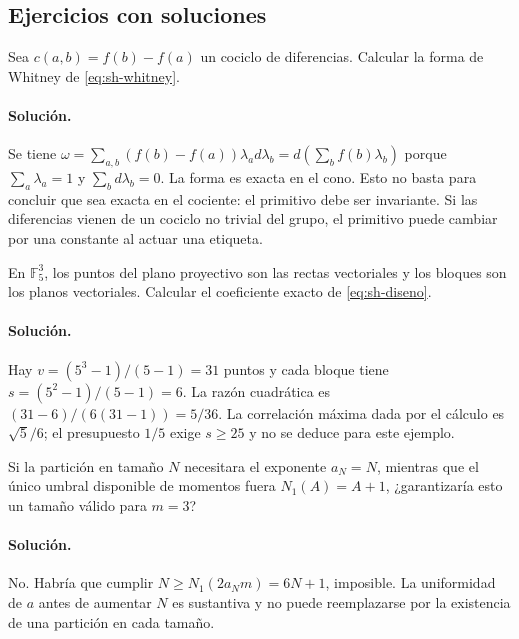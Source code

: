 \clearpage
\subsection{Ejercicios con soluciones}

\begin{ejercicio}
Sea $c(a,b)=f(b)-f(a)$ un cociclo de diferencias. Calcular la forma de Whitney de \eqref{eq:sh-whitney}.
\end{ejercicio}
\paragraph{Solución.} Se tiene $\omega=\sum_{a,b}(f(b)-f(a))\lambda_a d\lambda_b=d(\sum_b f(b)\lambda_b)$ porque $\sum_a\lambda_a=1$ y $\sum_b d\lambda_b=0$. La forma es exacta en el cono. Esto no basta para concluir que sea exacta en el cociente: el primitivo debe ser invariante. Si las diferencias vienen de un cociclo no trivial del grupo, el primitivo puede cambiar por una constante al actuar una etiqueta.

\begin{ejercicio}
En $\mathbb F_5^3$, los puntos del plano proyectivo son las rectas vectoriales y los bloques son los planos vectoriales. Calcular el coeficiente exacto de \eqref{eq:sh-diseno}.
\end{ejercicio}
\paragraph{Solución.} Hay $v=(5^3-1)/(5-1)=31$ puntos y cada bloque tiene $s=(5^2-1)/(5-1)=6$. La razón cuadrática es $(31-6)/(6(31-1))=5/36$. La correlación máxima dada por el cálculo es $\sqrt5/6$; el presupuesto $1/5$ exige $s\ge25$ y no se deduce para este ejemplo.

\begin{ejercicio}
Si la partición en tamaño $N$ necesitara el exponente $a_N=N$, mientras que el único umbral disponible de momentos fuera $N_1(A)=A+1$, ¿garantizaría esto un tamaño válido para $m=3$?
\end{ejercicio}
\paragraph{Solución.} No. Habría que cumplir $N\ge N_1(2a_Nm)=6N+1$, imposible. La uniformidad de $a$ antes de aumentar $N$ es sustantiva y no puede reemplazarse por la existencia de una partición en cada tamaño.

